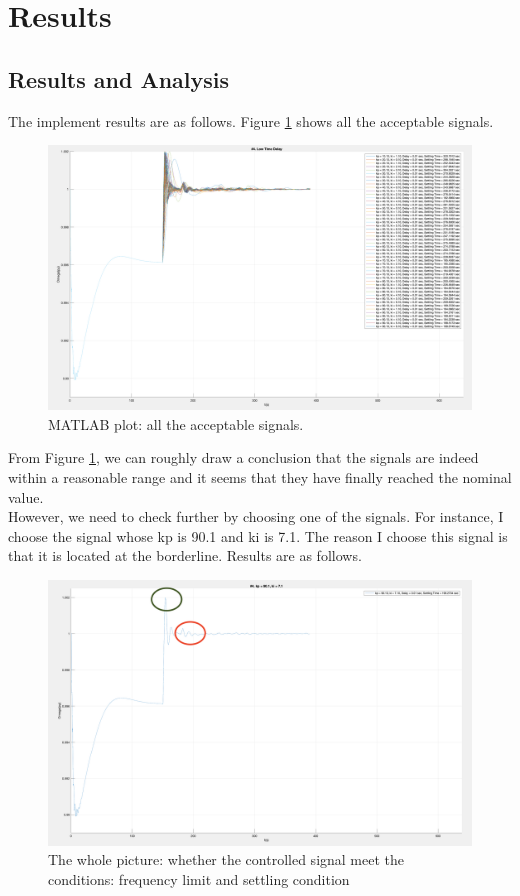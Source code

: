 \documentclass{report}
\begin{document}
\section{Results} %
\label{section4.4}
\subsection{Results and Analysis} %
The implement results are as follows. Figure \textcolor{red}{\ref{4_4_1_result1}} shows all the acceptable signals.

\begin{figure}[htbp]
\centering
\includegraphics[width = .819\textwidth]{figure/4_4_1_result1.png}
\caption{MATLAB plot: all the acceptable signals.}
\label{4_4_1_result1}
\end{figure}

From Figure \textcolor{red}{\ref{4_4_1_result1}}, we can roughly draw a conclusion that the signals are indeed within a reasonable range and it seems that they have finally reached the nominal value. \\

However, we need to check further by choosing one of the signals. For instance, I choose the signal whose kp is 90.1 and ki is 7.1. The reason I choose this signal is that it is located at the borderline. Results are as follows. \\

\begin{figure}[htbp]
\centering
\includegraphics[width = .819\textwidth]{figure/4_4_1_result2.png}
\caption{The whole picture: whether the controlled signal meet the conditions: frequency limit and settling condition}
\label{4_4_1_result2}
\end{figure}
\end{document}
